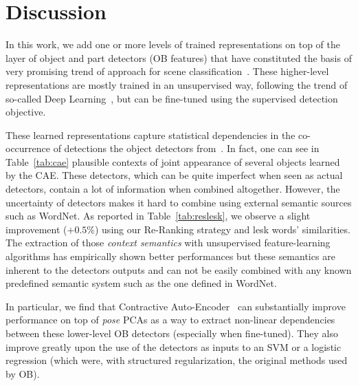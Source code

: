 \documentclass[runningheads,a4paper]{llncs}
\begin{document}
%

\section{Discussion}\label{sec:disc}

In this work, we add one or more levels of trained representations on top of
the layer of object and part detectors (OB features) that have constituted the
basis of very promising trend of approach for scene
classification~\citep{LiJiaLi10}.
%
These higher-level representations are mostly trained in an unsupervised way,
following the trend of so-called Deep
Learning~\citep{Hinton06,Bengio-2009,Jarrett-ICCV2009}, but can be fine-tuned
using the supervised detection objective.
%

These learned representations capture statistical dependencies in the
co-occurrence of detections the object detectors from~\citep{LiJiaLi10}.  In
fact, one can see in Table~\ref{tab:cae} plausible contexts of joint appearance
of several objects learned by the CAE.
%
These detectors, which can be quite imperfect when seen as actual detectors,
contain a lot of information when combined altogether. However, the uncertainty
of detectors makes it hard to combine using external semantic sources such as
WordNet. As reported in Table~\ref{tab:reslesk}, we observe a slight
improvement ($+0.5\%$) using our Re-Ranking strategy and lesk words'
similarities.
%
The extraction of those {\it context semantics} with unsupervised
feature-learning algorithms has empirically shown better performances but these
semantics are inherent to the detectors outputs and can not be easily combined
with any known predefined semantic system such as the one defined in WordNet.

%

In particular, we find that Contractive
Auto-Encoder~\citep{Rifai+al-2011} can substantially improve
performance on top of \textit{pose} PCAs as a way to extract non-linear
dependencies between these lower-level OB detectors (especially when
fine-tuned). They also improve greatly upon the use of the detectors as inputs
to an SVM or a logistic regression (which were, with structured regularization,
the original methods used by OB).
%
\end{document}
